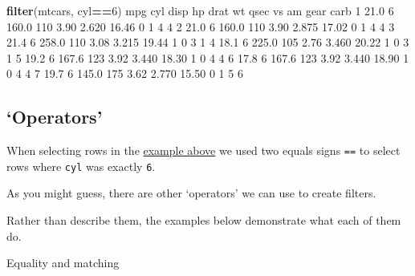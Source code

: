 \documentclass[]{article}
\newenvironment{Shaded}{\begin{snugshade}}{\end{snugshade}}
\newcommand{\DecValTok}[1]{\textcolor[rgb]{0.00,0.00,0.81}{#1}}
\newcommand{\FloatTok}[1]{\textcolor[rgb]{0.00,0.00,0.81}{#1}}
\newcommand{\KeywordTok}[1]{\textcolor[rgb]{0.13,0.29,0.53}{\textbf{#1}}}
\newcommand{\NormalTok}[1]{#1}
\newcommand{\OperatorTok}[1]{\textcolor[rgb]{0.81,0.36,0.00}{\textbf{#1}}}
\begin{document}
\begin{Shaded}
\begin{Highlighting}[]
\KeywordTok{filter}\NormalTok{(mtcars, cyl}\OperatorTok{==}\DecValTok{6}\NormalTok{)}
\NormalTok{   mpg cyl  disp  hp drat    wt  qsec vs am gear carb}
\DecValTok{1} \FloatTok{21.0}   \DecValTok{6} \FloatTok{160.0} \DecValTok{110} \FloatTok{3.90} \FloatTok{2.620} \FloatTok{16.46}  \DecValTok{0}  \DecValTok{1}    \DecValTok{4}    \DecValTok{4}
\DecValTok{2} \FloatTok{21.0}   \DecValTok{6} \FloatTok{160.0} \DecValTok{110} \FloatTok{3.90} \FloatTok{2.875} \FloatTok{17.02}  \DecValTok{0}  \DecValTok{1}    \DecValTok{4}    \DecValTok{4}
\DecValTok{3} \FloatTok{21.4}   \DecValTok{6} \FloatTok{258.0} \DecValTok{110} \FloatTok{3.08} \FloatTok{3.215} \FloatTok{19.44}  \DecValTok{1}  \DecValTok{0}    \DecValTok{3}    \DecValTok{1}
\DecValTok{4} \FloatTok{18.1}   \DecValTok{6} \FloatTok{225.0} \DecValTok{105} \FloatTok{2.76} \FloatTok{3.460} \FloatTok{20.22}  \DecValTok{1}  \DecValTok{0}    \DecValTok{3}    \DecValTok{1}
\DecValTok{5} \FloatTok{19.2}   \DecValTok{6} \FloatTok{167.6} \DecValTok{123} \FloatTok{3.92} \FloatTok{3.440} \FloatTok{18.30}  \DecValTok{1}  \DecValTok{0}    \DecValTok{4}    \DecValTok{4}
\DecValTok{6} \FloatTok{17.8}   \DecValTok{6} \FloatTok{167.6} \DecValTok{123} \FloatTok{3.92} \FloatTok{3.440} \FloatTok{18.90}  \DecValTok{1}  \DecValTok{0}    \DecValTok{4}    \DecValTok{4}
\DecValTok{7} \FloatTok{19.7}   \DecValTok{6} \FloatTok{145.0} \DecValTok{175} \FloatTok{3.62} \FloatTok{2.770} \FloatTok{15.50}  \DecValTok{0}  \DecValTok{1}    \DecValTok{5}    \DecValTok{6}
\end{Highlighting}
\end{Shaded}

\hypertarget{operators}{%
\subsection*{`Operators'}\label{operators}}

When selecting rows in the \protect\hyperlink{selecting-rows}{example above} we used two equals
signs \texttt{==} to select rows where \texttt{cyl} was exactly \texttt{6}.

As you might guess, there are other `operators' we can use to create filters.

Rather than describe them, the examples below demonstrate what each of them do.

Equality and matching
\end{document}
